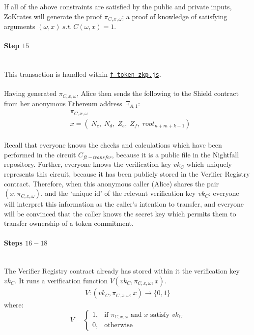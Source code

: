 \documentclass{article}
\begin{document}
\noindent
If all of the above constraints are satisfied by the public and private inputs, ZoKrates will generate the proof $\pi_{C,x,\omega}$; a proof of knowledge of satisfying arguments $(\omega, x) \ s.t. \ C(\omega, x) = 1$.

\paragraph{Step $15$}
\ \\
This transaction is handled within \hyperref[sec:f-token-zkp]{\texttt{f-token-zkp.js}}.\\
\\
Having generated $\pi_{C,x,\omega}$, Alice then sends the following to the Shield contract from her anonymous Ethereum address $\Xi_{A,1}$:
\begin{align*}
  &\pi_{C,x,\omega}\\
  &x = (\;N_c,\;N_d,\;Z_e,\;Z_f,\;root_{n+m+k-1})
\end{align*}
\\
Recall that everyone knows the checks and calculations which have been performed in the circuit $C_{ft-transfer}$, because it is a public file in the Nightfall repository. Further, everyone knows the verification key $vk_C$ which uniquely represents this circuit, because it has been publicly stored in the Verifier Registry contract. Therefore, when this anonymous caller (Alice) shares the pair $(x, \pi_{C,x,\omega})$, and the `unique id' of the relevant verification key $vk_C$; everyone will interpret this information as the caller's intention to transfer, and everyone will be convinced that the caller knows the secret key which permits them to transfer ownership of a token commitment.



\paragraph{Steps $16 - 18$}
\ \\
The Verifier Registry contract already has stored within it the verification key $vk_C$.
It runs a verification function $V(vk_C, \pi_{C,x,\omega}, x)$.
\begin{align*}
  V: (vk_C, \pi_{C,x,\omega}, x) \to \{0,1\}
\end{align*}
where:
\[
    V=
\begin{cases}
    1,& \text{if } \pi_{C,x,\omega} \text{ and } x \text{ satisfy } vk_C\\
    0,& \text{otherwise}
\end{cases}
\]
\end{document}
